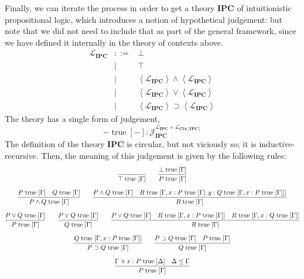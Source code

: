 \documentclass{amsart}
\theoremstyle{definition}
\theoremstyle{remark}
\numberwithin{equation}{section}
\newcommand{\quo}[1]{\left\langle#1\right\rangle}
\begin{document}
Finally, we can iterate the process in order to get a theory $\mathbf{IPC}$ of
intuitionistic propositional logic, which introduces a notion of hypothetical
judgement: but note that we did not need to include that as part of the general
framework, since we have defined it internally in the theory of contexts above.
\[
  \begin{array}{lcl}
    \mathcal{L}_\mathbf{IPC}
      &::= &\bot\\
      &\mid &\top\\
      &\mid &\quo{\mathcal{L}_\mathbf{IPC}}\land\quo{\mathcal{L}_\mathbf{IPC}}\\
      &\mid &\quo{\mathcal{L}_\mathbf{IPC}}\lor\quo{\mathcal{L}_\mathbf{IPC}}\\
      &\mid &\quo{\mathcal{L}_\mathbf{IPC}}\supset\quo{\mathcal{L}_\mathbf{IPC}}
  \end{array}
\]
The theory has a single form of judgement,
\[
  -\;\mathrm{true}\;[-] : \mathcal{J}_\mathbf{IPC}^{\mathcal{L}_\mathbf{IPC}\times\mathcal{L}_{\mathbf{Ctx}[\mathbf{IPC}]}}
\]
The definition of the theory $\mathbf{IPC}$ is circular, but not viciously so;
it is inductive-recursive. Then, the meaning of this judgement is given by the
following rules:
\begin{gather*}
  \infer{\top\;\mathrm{true}\;[\Gamma]}{}
  \qquad
  \infer{P\;\mathrm{true}\;[\Gamma]}{\bot\;\mathrm{true}\;[\Gamma]}\\[6pt]
  \infer{
    P\land Q\;\mathrm{true}\;[\Gamma]
  }{
    P\;\mathrm{true}\;[\Gamma] &
    Q\;\mathrm{true}\;[\Gamma]
  }
  \qquad
  \infer{
    R\;\mathrm{true}\;[\Gamma]
  }{
    P\land Q\;\mathrm{true}\;[\Gamma] &
    R\;\mathrm{true}\;[\Gamma,x:P\;\mathrm{true}\;[\Gamma];y:Q\;\mathrm{true}\;[\Gamma,x:P\;\mathrm{true}\;[\Gamma]]]
  }\\[6pt]
  \infer{
    P\;\mathrm{true}\;[\Gamma]
  }{
    P\lor Q\;\mathrm{true}\;[\Gamma]
  }
  \qquad
  \infer{
    Q\;\mathrm{true}\;[\Gamma]
  }{
    P\lor Q\;\mathrm{true}\;[\Gamma]
  }
  \qquad
  \infer{
    R\;\mathrm{true}\;[\Gamma]
  }{
    P\lor Q\;\mathrm{true}\;[\Gamma] &
    R\;\mathrm{true}\;[\Gamma,x:P\;\mathrm{true}\;[\Gamma]] &
    R\;\mathrm{true}\;[\Gamma,x:Q\;\mathrm{true}\;[\Gamma]]
  }\\[6pt]
  \infer{
    P\supset Q\;\mathrm{true}\;[\Gamma]
  }{
    Q\;\mathrm{true}\;[\Gamma,x:P\;\mathrm{true}\;[\Gamma]]
  }
  \qquad
  \infer{
    Q\;\mathrm{true}\;[\Gamma]
  }{
    P\supset Q\;\mathrm{true}\;[\Gamma] &
    P\;\mathrm{true}\;[\Gamma]
  }\\[6pt]
  \infer{
    P\;\mathrm{true}\;[\Gamma]
  }{
    \Gamma\ni x:P\;\mathrm{true}\;[\Delta] &
    \Delta\leq\Gamma
  }
\end{gather*}
\end{document}
